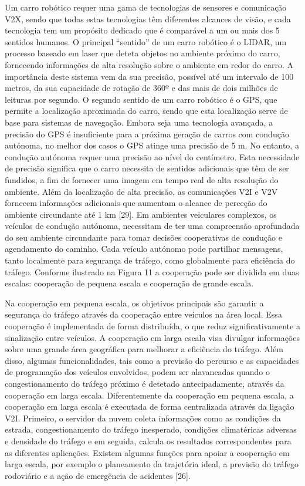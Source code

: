 \documentclass[a4paper,10pt]{texRel}
\begin{document}
Um carro robótico requer uma gama de tecnologias de sensores e comunicação V2X, sendo que todas estas tecnologias têm diferentes alcances de visão, e cada tecnologia tem um propósito dedicado que é comparável a um ou mais dos 5 sentidos humanos. O principal “sentido” de um carro robótico é o LIDAR, um processo baseado em laser que deteta objetos no ambiente próximo do carro, fornecendo informações de alta resolução sobre o ambiente em redor do carro. A importância deste sistema vem da sua precisão, possível até um intervalo de 100 metros, da sua capacidade de rotação de 360º e das mais de dois milhões de leituras por segundo. O segundo sentido de um carro robótico é o GPS, que permite a localização aproximada do carro, sendo que esta localização serve de base para sistemas de navegação. Embora seja uma tecnologia avançada, a precisão do GPS é insuficiente para a próxima geração de carros com condução autónoma, no melhor dos casos o GPS atinge uma precisão de 5 m. No entanto, a condução autónoma requer uma precisão ao nível do centímetro. Esta necessidade de precisão significa que o carro necessita de sentidos adicionais que têm de ser fundidos, a fim de fornecer uma imagem em tempo real de alta resolução do ambiente.  
Além da localização de alta precisão, as comunicações V2I e V2V fornecem informações adicionais que aumentam o alcance de perceção do ambiente circundante até 1 km [29].
Em ambientes veiculares complexos, os veículos de condução autónoma, necessitam de ter uma compreensão aprofundada do seu ambiente circundante para tomar decisões cooperativas de condução e agendamento do caminho.
Cada veículo autónomo pode partilhar mensagens, tanto localmente para segurança de tráfego, como globalmente para eficiência do tráfego. Conforme ilustrado na Figura 11 a cooperação pode ser dividida em duas escalas: cooperação de pequena escala e cooperação de grande escala. 

Na cooperação em pequena escala, os objetivos principais são garantir a segurança do tráfego através da cooperação entre veículos na área local. Essa cooperação é implementada de forma distribuída, o que reduz significativamente a sinalização entre veículos.
A cooperação em larga escala visa divulgar informações sobre uma grande área geográfica para melhorar a eficiência do tráfego. Além disso, algumas funcionalidades, tais como a previsão do percurso e as capacidades de programação dos veículos envolvidos, podem ser alavancadas quando o congestionamento do tráfego próximo é detetado antecipadamente, através da cooperação em larga escala. Diferentemente da cooperação em pequena escala, a cooperação em larga escala é executada de forma centralizada através da ligação V2I. Primeiro, o servidor da nuvem coleta informações como as condições da estrada, congestionamento do tráfego inesperado, condições climatéricas adversas e densidade do tráfego e em seguida, calcula os resultados correspondentes para as diferentes aplicações. Existem algumas funções para apoiar a cooperação em larga escala, por exemplo o planeamento da trajetória ideal, a previsão do tráfego rodoviário e a ação de emergência de acidentes [26].
\end{document}
